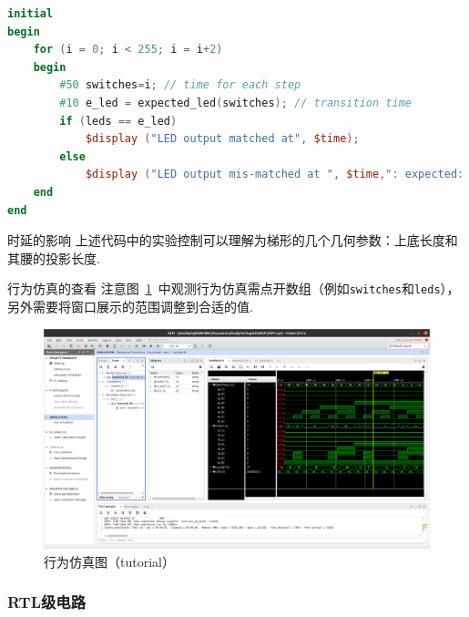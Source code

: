 \documentclass[11pt]{SEU-Digital-Report}
\begin{document}
                \begin{lstlisting}[language=verilog,title=tutorial\_tb.v]
initial
begin
    for (i = 0; i < 255; i = i+2)
    begin
        #50 switches=i; // time for each step
        #10 e_led = expected_led(switches); // transition time
        if (leds == e_led)
            $display ("LED output matched at", $time);
        else
            $display ("LED output mis-matched at ", $time,": expected: %b, actual: %b", e_led, leds);
    end
end
                \end{lstlisting}

                \begin{analyze}{时延的影响}{}
                    上述代码中的实验控制可以理解为梯形的几个几何参数：上底长度和其腰的投影长度.
                \end{analyze}

                \begin{note}{行为仿真的查看}{}
                    注意图~\ref{fig:behavioral_simulation}~中观测行为仿真需点开数组（例如\texttt{switches}和\texttt{leds}），
                    另外需要将窗口展示的范围调整到合适的值.
                \end{note}

                \begin{figure}[htbp]
                    \includegraphics[width=\linewidth]{fig/behavioral_simulation_EXP1.png}
                    \caption{行为仿真图（tutorial）}
                    \label{fig:behavioral_simulation}
                \end{figure}

            \subsubsection{RTL级电路}
\end{document}
